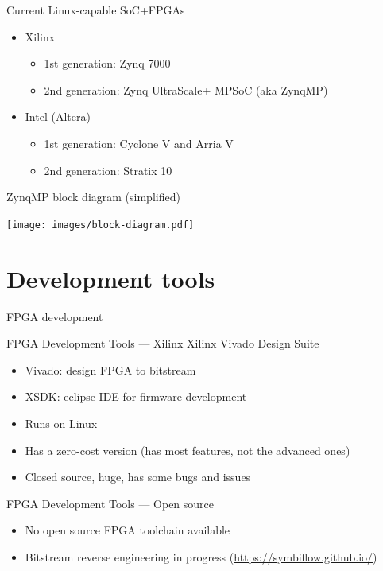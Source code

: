 \documentclass[xetex,table]{beamer}
\begin{document}
\begin{frame}{Current Linux-capable SoC+FPGAs}
  \begin{itemize}
  \item Xilinx
    \begin{itemize}
    \item 1st generation: Zynq 7000
    \item 2nd generation: Zynq UltraScale+ MPSoC (aka ZynqMP)
    \end{itemize}
  \item Intel (Altera)
    \begin{itemize}
    \item 1st generation: Cyclone V and Arria V
    \item 2nd generation: Stratix 10
    \end{itemize}
  \end{itemize}
\end{frame}

\begin{frame}{ZynqMP block diagram (simplified)}
  \begin{center}
    \texttt{[image: images/block-diagram.pdf]}
  \end{center}
\end{frame}

\section{Development tools}

\begin{frame}[standout]
  FPGA development
\end{frame}

\begin{frame}{FPGA Development Tools --- Xilinx}
  Xilinx Vivado Design Suite
  \begin{itemize}
  \item Vivado: design FPGA to bitstream
  \item XSDK: eclipse IDE for firmware development
  \item Runs on Linux
  \item Has a zero-cost version (has most features, not the advanced
    ones)
  \item Closed source, huge, has some bugs and issues
  \end{itemize}
\end{frame}

\begin{frame}{FPGA Development Tools --- Open source}
  \begin{itemize}
  \item No open source FPGA toolchain available
  \item Bitstream reverse engineering in progress
    (\url{https://symbiflow.github.io/})
  \end{itemize}
\end{frame}
\end{document}
